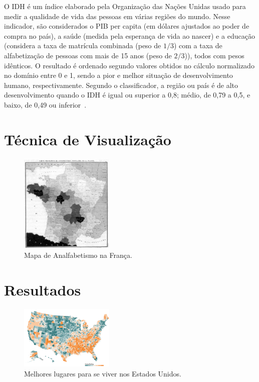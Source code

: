 \documentclass[conference]{IEEEtran}
\begin{document}
O IDH é um índice elaborado pela Organização das Nações Unidas usado para medir a qualidade de vida das pessoas em várias regiões do mundo. Nesse indicador, são considerados o PIB per capita (em dólares ajustados ao poder de compra no país), a saúde (medida pela esperança de vida ao nascer) e a educação (considera a taxa de matrícula combinada (peso de $1/3$) com a taxa de alfabetização de pessoas com mais de 15 anos (peso de $2/3$)), todos com pesos idênticos. O resultado é ordenado segundo valores obtidos no cálculo normalizado no domínio entre 0 e 1, sendo a pior e melhor situação de desenvolvimento humano, respectivamente. Segundo o classificador, a região ou país é de alto desenvolvimento quando o IDH é igual ou superior a 0,8; médio, de 0,79 a 0,5, e baixo, de 0,49 ou inferior~\cite{atlas, senak, espn, oxford, araujo}.


\section{Técnica de Visualização}

\begin{figure}[!ht]
\centering
\includegraphics[width=0.4\textwidth]{analfabetismo-franca.jpg}
\caption{Mapa de Analfabetismo na França.}
\label{img:analfabetismo-franca}
\end{figure}


\section{Resultados}

\begin{figure}[!ht]
\centering
\includegraphics[width=0.40\textwidth]{usa.png}
\caption{Melhores lugares para se viver nos Estados Unidos.}
\label{img:lugares-viver-usa}
\end{figure}
\end{document}
